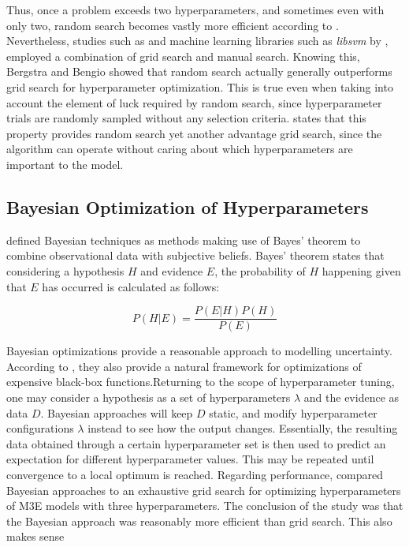 Thus, once a problem exceeds two hyperparameters, and sometimes even with only two, random search becomes vastly more efficient according to \cite{Bergstra2012}. Nevertheless, studies such as \cite{Duan2005} and machine learning libraries such as \textit{libsvm} by \cite{Chang2011}, employed a combination of grid search and manual search. Knowing this, Bergstra and Bengio showed that random search actually generally outperforms grid search for hyperparameter optimization. This is true even when taking into account the element of luck required by random search, since hyperparameter trials are randomly sampled without any selection criteria. \cite{Snoek2012} states that this property provides random search yet another advantage grid search, since the algorithm can operate without caring about which hyperparameters are important to the model.


\subsection{Bayesian Optimization of Hyperparameters}
\label{sec:bayesian-optimization}
\cite{Press2005} defined Bayesian techniques as methods making use of Bayes' theorem to combine observational data with subjective beliefs.  Bayes' theorem states that considering a hypothesis $H$ and evidence $E$, the probability of $H$ happening given that $E$ has occurred is calculated as follows:

\[P(H|E) = \frac{P(E|H)P(H)}{P(E)}\]

Bayesian optimizations provide a reasonable approach to modelling uncertainty. According to \cite{Snoek2015}, they also provide a natural framework for optimizations of expensive black-box functions.Returning to the scope of hyperparameter tuning, one may consider a hypothesis as a set of hyperparameters $\lambda$ and the evidence as data $D$. Bayesian approaches will keep $D$ static, and modify hyperparameter configurations $\lambda$ instead to see how the output changes. Essentially, the resulting data obtained through a certain hyperparameter set is then used to predict an expectation for different hyperparameter values. This may be repeated until convergence to a local optimum is reached. Regarding performance, \cite{Snoek2012} compared Bayesian approaches to an exhaustive grid search for optimizing hyperparameters of M3E models with three hyperparameters. The conclusion of the study was that the Bayesian approach was reasonably more efficient than grid search. This also makes sense 

